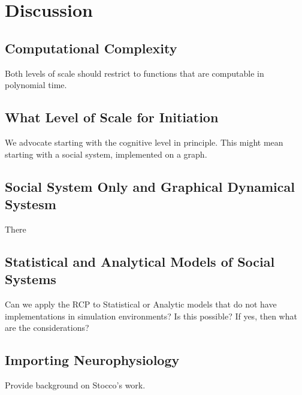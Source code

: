 \documentclass{article}
\begin{document}
\section{Discussion}
\subsection{Computational Complexity}
Both levels of scale should restrict to functions that are computable in polynomial time.  

\subsection{What Level of Scale for Initiation}
We advocate starting with the cognitive level in principle.  This might mean starting with a social system, implemented on a graph. 

\subsection{Social System Only and Graphical Dynamical Systesm}
There 

\subsection{Statistical and Analytical Models of Social Systems}
Can we apply the RCP to Statistical or Analytic models that do not have implementations in simulation environments?  Is this possible?  If yes, then what are the considerations?

\subsection{Importing Neurophysiology}
Provide background on Stocco's work.
\end{document}
